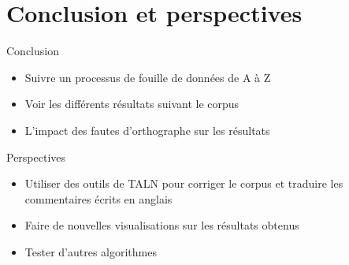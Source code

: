 \documentclass{beamer}
\begin{document}
\section{Conclusion et perspectives}
\begin{frame}
	\begin{block}{Conclusion}
		\begin{itemize}
			\item Suivre un processus de fouille de données de A à Z
			\item Voir les différents résultats suivant le corpus
			\item L'impact des fautes d'orthographe sur les résultats
		\end{itemize}
	\end{block}
\end{frame}

\begin{frame}
	\begin{block}{Perspectives}
	
	\begin{itemize}
		\item Utiliser des outils de TALN pour corriger le corpus et traduire les commentaires écrits en anglais
		\item Faire de nouvelles visualisations sur les résultats obtenus
		\item Tester d'autres algorithmes
	\end{itemize}
	
	\end{block}
\end{frame}
\end{document}
